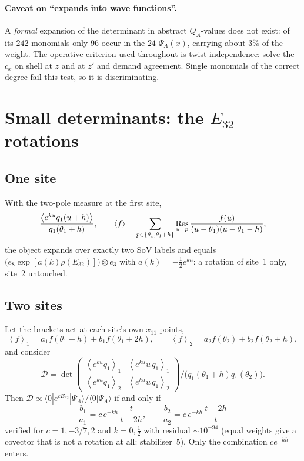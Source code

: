 \documentclass[11pt]{article}
\newcommand{\ket}[1]{|#1\rangle}
\newcommand{\vac}{\langle 0|}
\newcommand{\Ev}[1]{\left\langle #1 \right\rangle}
\begin{document}
\paragraph{Caveat on ``expands into wave functions''.} A \emph{formal} expansion of the determinant
in abstract $Q_A$-values does not exist: of its $242$ monomials only $96$ occur in the $24$
$\Psi_A(x)$, carrying about $3\%$ of the weight. The operative criterion used throughout is
twist-independence: solve the $c_x$ on shell at $z$ and at $z'$ and demand agreement. Single
monomials of the correct degree fail this test, so it is discriminating.

\section{Small determinants: the $E_{32}$ rotations}

\subsection{One site}

With the two-pole measure at the first site,
\begin{equation}
\frac{\Ev{e^{ku}q_1(u+h)}}{q_1(\theta_1+h)},\qquad
\Ev{f}=\sum_{p\in\{\theta_1,\theta_1+h\}}\mathop{\rm Res}_{u=p}\frac{f(u)}{(u-\theta_1)(u-\theta_1-h)},
\end{equation}
the object expands over exactly two SoV labels and equals
$\big(e_8\exp[a(k)\rho(E_{32})]\big)\otimes e_3$ with $a(k)=-\tfrac12e^{kh}$: a rotation of site~1
only, site~2 untouched.

\subsection{Two sites}

Let the brackets act at each site's own $x_{11}$ points,
\begin{equation}
\Ev{f}_1=a_1f(\theta_1+h)+b_1f(\theta_1+2h),\qquad
\Ev{f}_2=a_2f(\theta_2)+b_2f(\theta_2+h),
\end{equation}
and consider
\begin{equation}
\mathcal D=\det\begin{pmatrix}
\Ev{e^{ku}q_1}_1&\Ev{e^{ku}u\,q_1}_1\\[2pt]
\Ev{e^{ku}q_1}_2&\Ev{e^{ku}u\,q_1}_2\end{pmatrix}\Big/\big(q_1(\theta_1+h)q_1(\theta_2)\big).
\end{equation}
Then $\mathcal D\propto\vac e^{cE_{32}}\ket{\Psi_A}/\vac\Psi_A\rangle$ if and only if
\begin{equation}
\boxed{\;\frac{b_1}{a_1}=c\,e^{-kh}\,\frac{t}{t-2h},\qquad
\frac{b_2}{a_2}=c\,e^{-kh}\,\frac{t-2h}{t}\;}
\end{equation}
verified for $c=1,-3/7,2$ and $k=0,\tfrac12$ with residual $\sim10^{-94}$ (equal weights give a
covector that is not a rotation at all: stabiliser~$5$). Only the combination $ce^{-kh}$ enters.
\end{document}
